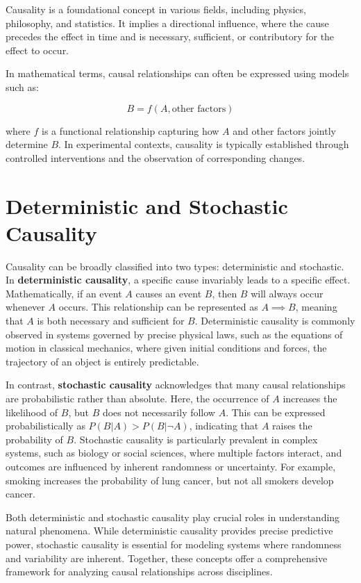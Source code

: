 \documentclass[English, Lau, oneside]{sapthesis}
\begin{document}
\begin{itemize}
Causality is a foundational concept in various fields, including physics, philosophy, and statistics. It implies a directional influence, where the cause precedes the effect in time and is necessary, sufficient, or contributory for the effect to occur. 

In mathematical terms, causal relationships can often be expressed using models such as:

\[
B = f(A, \text{other factors}) 
\]

where \( f \) is a functional relationship capturing how \( A \) and other factors jointly determine \( B \). In experimental contexts, causality is typically established through controlled interventions and the observation of corresponding changes.
\section*{Deterministic and Stochastic Causality}

Causality can be broadly classified into two types: deterministic and stochastic. In \textbf{deterministic causality}, a specific cause invariably leads to a specific effect. Mathematically, if an event \( A \) causes an event \( B \), then \( B \) will always occur whenever \( A \) occurs. This relationship can be represented as \( A \implies B \), meaning that \( A \) is both necessary and sufficient for \( B \). Deterministic causality is commonly observed in systems governed by precise physical laws, such as the equations of motion in classical mechanics, where given initial conditions and forces, the trajectory of an object is entirely predictable.

In contrast, \textbf{stochastic causality} acknowledges that many causal relationships are probabilistic rather than absolute. Here, the occurrence of \( A \) increases the likelihood of \( B \), but \( B \) does not necessarily follow \( A \). This can be expressed probabilistically as \( P(B|A) > P(B|\neg A) \), indicating that \( A \) raises the probability of \( B \). Stochastic causality is particularly prevalent in complex systems, such as biology or social sciences, where multiple factors interact, and outcomes are influenced by inherent randomness or uncertainty. For example, smoking increases the probability of lung cancer, but not all smokers develop cancer.

Both deterministic and stochastic causality play crucial roles in understanding natural phenomena. While deterministic causality provides precise predictive power, stochastic causality is essential for modeling systems where randomness and variability are inherent. Together, these concepts offer a comprehensive framework for analyzing causal relationships across disciplines.


\end{itemize}
\end{document}

